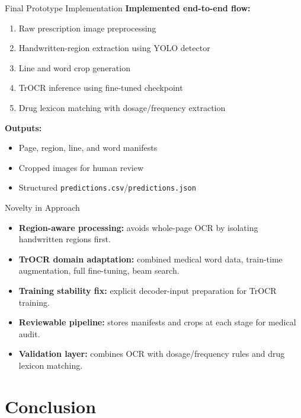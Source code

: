 \documentclass{beamer}
\begin{document}
\begin{frame}{Final Prototype Implementation}
\textbf{Implemented end-to-end flow:}
\begin{enumerate}
    \item Raw prescription image preprocessing
    \item Handwritten-region extraction using YOLO detector
    \item Line and word crop generation
    \item TrOCR inference using fine-tuned checkpoint
    \item Drug lexicon matching with dosage/frequency extraction
\end{enumerate}

\vspace{0.2cm}
\textbf{Outputs:}
\begin{itemize}
    \item Page, region, line, and word manifests
    \item Cropped images for human review
    \item Structured \texttt{predictions.csv}/\texttt{predictions.json}
\end{itemize}
\end{frame}


\begin{frame}{Novelty in Approach}
\begin{itemize}
    \item \textbf{Region-aware processing:} avoids whole-page OCR by isolating handwritten regions first.
    \item \textbf{TrOCR domain adaptation:} combined medical word data, train-time augmentation, full fine-tuning, beam search.
    \item \textbf{Training stability fix:} explicit decoder-input preparation for TrOCR training.
    \item \textbf{Reviewable pipeline:} stores manifests and crops at each stage for medical audit.
    \item \textbf{Validation layer:} combines OCR with dosage/frequency rules and drug lexicon matching.
\end{itemize}
\end{frame}




\section{Conclusion}
\end{document}
